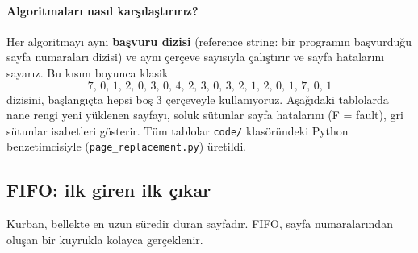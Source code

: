 \documentclass[11pt,a4paper]{article}
\newcommand{\term}[1]{\textbf{\color{mintdeep}#1}}
\newcommand{\cmd}[1]{\texttt{#1}}
\begin{document}
\paragraph{Algoritmaları nasıl karşılaştırırız?} Her algoritmayı aynı \term{başvuru dizisi} (reference string: bir programın başvurduğu sayfa numaraları dizisi) ve aynı çerçeve sayısıyla çalıştırır ve sayfa hatalarını sayarız. Bu kısım boyunca klasik
\[
7,\,0,\,1,\,2,\,0,\,3,\,0,\,4,\,2,\,3,\,0,\,3,\,2,\,1,\,2,\,0,\,1,\,7,\,0,\,1
\]
dizisini, başlangıçta hepsi boş $3$ çerçeveyle kullanıyoruz. Aşağıdaki tablolarda nane rengi yeni yüklenen sayfayı, soluk sütunlar sayfa hatalarını (F = fault), gri sütunlar isabetleri gösterir. Tüm tablolar \texttt{code/} klasöründeki Python benzetimcisiyle (\cmd{page\_replacement.py}) üretildi.

\subsection{FIFO: ilk giren ilk çıkar}

Kurban, bellekte en uzun süredir duran sayfadır. FIFO, sayfa numaralarından oluşan bir kuyrukla kolayca gerçeklenir.
\end{document}
